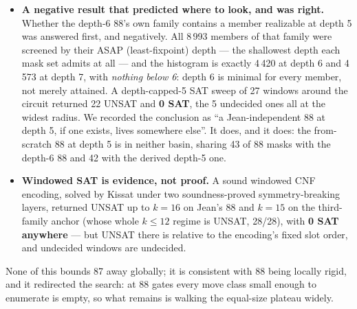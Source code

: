 \documentclass[11pt,a4paper]{article}
\begin{document}
\begin{itemize}
  --- four weight-7 targets, three of them column-rotations of one another ---
  and the from-scratch depth-5 88's is a third pattern again, rows 1, 7, 12, 13,
  17, 18, 21, 25, 27, 28 and 31. MixColumns has at least three structurally
  distinct ways to hit a depth wall at 88 gates, and they give way at different
  depths.
\item \textbf{A negative result that predicted where to look, and was right.}
  Whether the depth-6 88's own family contains a member realizable at depth 5
  was answered first, and negatively. All 8\,993 members of that
  family were screened by their ASAP (least-fixpoint) depth --- the shallowest
  depth each mask set admits at all --- and the histogram is exactly 4\,420 at
  depth 6 and 4\,573 at depth 7, with \emph{nothing below 6}: depth 6 is minimal
  for every member, not merely attained. A depth-capped-5 SAT sweep of 27 windows
  around the circuit returned 22 UNSAT and \textbf{0 SAT}, the 5 undecided ones
  all at the widest radius. We recorded the conclusion as ``a Jean-independent 88
  at depth 5, if one exists, lives somewhere else''. It does, and it does: the
  from-scratch 88 at depth 5 is in neither basin, sharing 43 of 88 masks with
  the depth-6 88 and 42 with the derived depth-5 one.
\item \textbf{Windowed SAT is evidence, not proof.} A sound windowed CNF
  encoding, solved by Kissat under two soundness-proved symmetry-breaking
  layers, returned UNSAT up to $k=16$ on Jean's 88 and $k=15$ on the
  third-family anchor (whose whole $k \le 12$ regime is UNSAT, 28/28), with
  \textbf{0 SAT anywhere} --- but UNSAT there is relative to the encoding's
  fixed slot order, and undecided windows are undecided.
\end{itemize}

None of this bounds 87 away globally; it is consistent with 88 being locally
rigid, and it redirected the search: at 88 gates every move class small enough
to enumerate is empty, so what remains is walking the equal-size plateau
widely.
\end{document}
